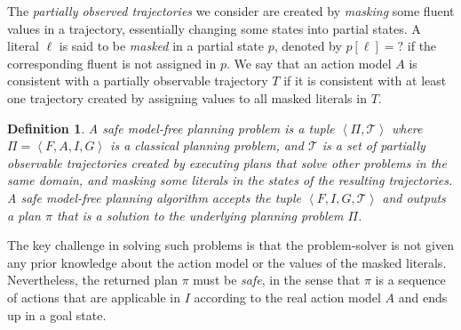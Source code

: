 \documentclass[letterpaper]{article} %
\newcommand{\tuple}[1]{\ensuremath{\left \langle #1 \right \rangle }}
\newcommand{\unobserved}{\textit{?}}
\newtheorem{definition}{Definition}
\begin{document}
The \emph{partially observed trajectories} we consider are created by \emph{masking} some fluent values in a trajectory, essentially changing some states into partial states.
A literal $\ell$ is said to be \emph{masked} in a partial state $p$, denoted by $p[\ell]=\unobserved$ if the corresponding fluent is not assigned in $p$.
We say that an action model $A$ is consistent with a partially observable trajectory $T$ if
it is consistent with at least one trajectory created by assigning values to all masked literals in $T$.
\begin{definition}
A safe model-free planning problem is a tuple $\tuple{\Pi, \mathcal{T}}$
where $\Pi=\tuple{F,A,I,G}$ is a classical planning problem,
and $\mathcal{T}$ is a set of partially observable trajectories created by
executing plans that solve other problems in the same domain, %
and masking some literals in the states of the resulting trajectories.
A safe model-free planning algorithm accepts the tuple $\tuple{F,I,G,\mathcal{T}}$ and outputs a plan $\pi$ that is a solution to the underlying planning problem $\Pi$.
\label{def:theProblem}
\end{definition}
The key challenge in solving such problems is that the problem-solver is not given any prior knowledge about the action model or the values of the masked literals.
Nevertheless, the returned plan $\pi$ must be \emph{safe}, in the sense that $\pi$ is a sequence of actions that are applicable in $I$ according to the real action model $A$ and ends up in a goal state.
\end{document}
